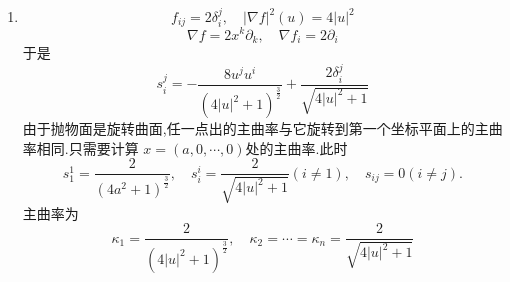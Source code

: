 \documentclass[../../几何与拓扑.tex]{subfiles}
\begin{document}
\begin{solution}
\begin{enumerate}
        \item \[
        f_{ij}= 2 \delta  _{i}^{j},\quad  \left|  \nabla f \right|^{2}\left( u \right) = 4\left| u\right|^{2}  
        \] \[
         \nabla f= 2 x^{k} \partial _{k},\quad   \nabla f_{i}= 2 \partial _{i }
        \]于是 \[
        s_{i}^{j}=  -\frac{8 u^{j}u^{i}  }{\left( 4\left| u \right|^{2}+ 1  \right)^{\frac{3}{2}}  } +  \frac{2 \delta  _{i}^{j} }{\sqrt{4\left| u \right|^{2} + 1} } 
        \] 由于抛物面是旋转曲面,任一点出的主曲率与它旋转到第一个坐标平面上的主曲率相同.只需要计算 \(  x= \left( a,0,\cdots ,0 \right)   \)处的主曲率.此时 \[
        s_{1}^{1}= \frac{2 }{\left( 4a^{2}+ 1 \right)^{\frac{3}{2}}  } ,\quad s_{i}^{i}= \frac{2 }{\sqrt{4\left| u \right|^{2}+ 1 } }\left(  i\neq 1 \right), \quad s_{ij}= 0 \left( i\neq j \right).   
        \] 主曲率为 \[
         \kappa _1 = \frac{2 }{\left( 4\left| u \right|^{2}+ 1  \right)^{\frac{3}{2}}  },\quad  \kappa _2 = \cdots =  \kappa _{n}= \frac{2 }{\sqrt{4\left| u \right|^{2}+ 1 } }  
        \]
    \end{enumerate}
    
\end{solution}

\hspace*{\fill} 

\hspace*{\fill} 
\end{document}

